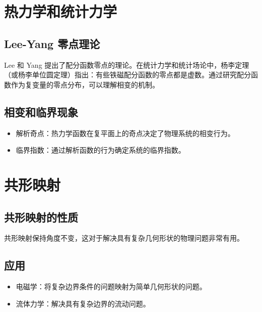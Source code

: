 \documentclass[12pt]{article}
\begin{document}
	
	\section{热力学和统计力学}
	
	\subsection{Lee-Yang 零点理论}
	Lee 和 Yang 提出了配分函数零点的理论。在统计力学和统计场论中，杨李定理（或杨李单位圆定理）指出：有些铁磁配分函数的零点都是虚数。通过研究配分函数作为复变量的零点分布，可以理解相变的机制。
	
	\subsection{相变和临界现象}
	\begin{itemize}
		\item 解析奇点：热力学函数在复平面上的奇点决定了物理系统的相变行为。
		\item 临界指数：通过解析函数的行为确定系统的临界指数。
	\end{itemize}
	
	
	
	\section{共形映射}
	
	\subsection{共形映射的性质}
	共形映射保持角度不变，这对于解决具有复杂几何形状的物理问题非常有用。
	
	\subsection{应用}
	\begin{itemize}
		\item 电磁学：将复杂边界条件的问题映射为简单几何形状的问题。
		\item 流体力学：解决具有复杂边界的流动问题。
	\end{itemize}
	
\end{document}

